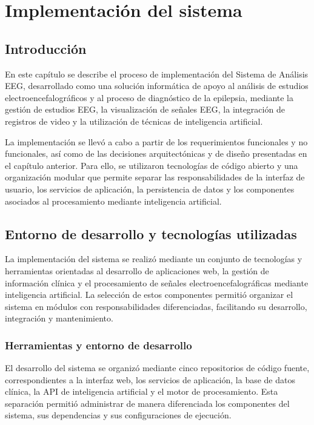 \chapter{Implementación del sistema}
\label{cap:implementacion-sistema}

\section{Introducción}
\label{introduccion}

En este capítulo se describe el proceso de implementación del Sistema de Análisis EEG, desarrollado como una solución informática de apoyo al
análisis de estudios electroencefalográficos y al proceso de diagnóstico
de la epilepsia, mediante la gestión de estudios EEG,
la visualización de señales EEG, la integración de registros de video
y la utilización de técnicas de inteligencia artificial.

La implementación se llevó a cabo a partir de los requerimientos
funcionales y no funcionales, así como de las decisiones arquitectónicas
y de diseño presentadas en el capítulo anterior. Para ello, se utilizaron
tecnologías de código abierto y una organización modular que permite
separar las responsabilidades de la interfaz de usuario, los servicios
de aplicación, la persistencia de datos y los componentes asociados
al procesamiento mediante inteligencia artificial.

\section{Entorno de desarrollo y tecnologías utilizadas}
\label{entorno-desarrollo-tecnologias-utilizadas}

La implementación del sistema se realizó mediante un conjunto de tecnologías y herramientas orientadas al desarrollo de aplicaciones web, la gestión de información clínica y el procesamiento de señales electroencefalográficas mediante inteligencia artificial. La selección de estos componentes permitió organizar el sistema en módulos con responsabilidades diferenciadas, facilitando su desarrollo, integración y mantenimiento.

\subsection{Herramientas y entorno de desarrollo}
\label{herramientas-entorno-desarrollo}

El desarrollo del sistema se organizó mediante cinco repositorios de código fuente, correspondientes a la interfaz web, los servicios de aplicación, la base de datos clínica, la API de inteligencia artificial y el motor de procesamiento. Esta separación permitió administrar de manera diferenciada los componentes del sistema, sus dependencias y sus configuraciones de ejecución.

